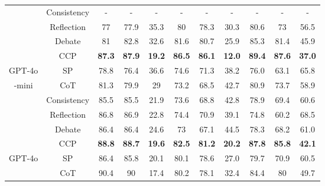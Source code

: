 \begin{table*}[ht]
{\begin{tabular}{c|c|ccc|ccc|ccc}
 & Consistency   & -    & -    & -    & -    & -    & -    & -    & -    & -    \\
 & Reflection & 77   & 77.9 & 35.3 & 80   & 78.3 & 30.3 & 80.6 & 73   & 56.5 \\
 & Debate     & 81   & 82.8 & 32.6 & 81.6 & 80.7 & 25.9 & 85.3 & 81.4 & 45.9 \\
 & CCP        & \textbf{87.3} & \textbf{87.9} & \textbf{19.2} & \textbf{86.5} & \textbf{86.1} & \textbf{12.0}   & \textbf{89.4} & \textbf{87.6} & \textbf{37.0} \\ \midrule
GPT-4o & SP         & 78.8                    & 76.4                    & 36.6                   & 74.6                    & 71.3                   & 38.2                    & 76.0                   & 63.1                 & 65.8                 \\
-mini   & CoT        & 81.3                    & 79.9                    & 29                     & 73.2                    & 68.5                   & 42.7                    & 80.9                 & 73.7                 & 58.9                 \\
        & Consistency& 85.5                    & 85.5                    & 21.9                   & 73.6                    & 68.8                   & 42.8                    & 78.9	               & 69.4                 & 60.6             \\
        & Reflection & 86.8                    & 86.9                    & 22.8                   & 74.4                    & 70.9                   & 39.1                    & 74.8                 & 60.2                 & 68.5                 \\
        & Debate     & 86.4                    & 86.4                    & 24.6                   & 73                      & 67.1                   & 44.5                    & 78.3                 & 68.2                 & 61.0                   \\
       & CCP        & \textbf{88.8}            & \textbf{88.7}          & \textbf{19.6}           & \textbf{82.5}           & \textbf{81.2}          & \textbf{20.2}           & \textbf{87.8}       & \textbf{85.8}         & \textbf{42.1}        \\ \midrule
GPT-4o & SP         & 86.4                    & 85.8                    & 20.1                   & 80.1                    & 78.6                   & 27.0                      & 79.7                 & 70.9                 & 60.5                 \\
       & CoT        & 90.4                    & 90                      & 17.4                   & 80.2                    & 78.1                   & 32.4                    & 84.4                 & 80                   & 49.7                 \\

\end{tabular}}
\end{table*}
